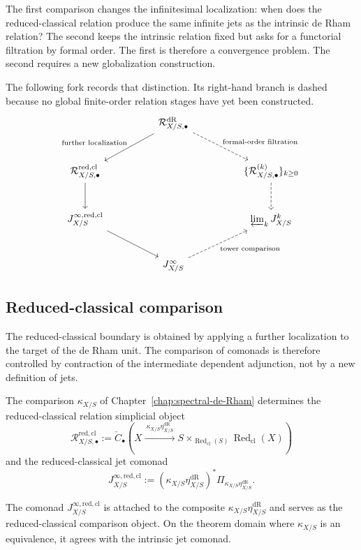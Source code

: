 The first comparison changes the infinitesimal localization: when does the
reduced-classical relation produce the same infinite jets as the intrinsic
de Rham relation? The second keeps the intrinsic relation fixed but asks for a
functorial filtration by formal order. The first is therefore a convergence
problem. The second requires a new globalization construction.

The following fork records that distinction. Its right-hand branch is dashed
because no global finite-order relation stages have yet been constructed.
\[
\begin{tikzcd}[column sep=huge,row sep=large]
&
\mathcal R^{\mathrm{dR}}_{X/S,\bullet}
  \ar[dl,"{\text{further localization}}"']
  \ar[dr,dashed,"{\text{formal-order filtration}}"]
&
\\
\mathcal R^{\mathrm{red,cl}}_{X/S,\bullet}
  \ar[d]
&&
\{\mathcal R^{(k)}_{X/S,\bullet}\}_{k\geq0}
  \ar[d,dashed]
\\
J^{\infty,\mathrm{red,cl}}_{X/S}
  \ar[dr]
&&
\varprojlim_k J^k_{X/S}
\\
&
J^\infty_{X/S}
  \ar[ur,dashed,"{\text{tower comparison}}"']
&
\end{tikzcd}
\]
\subsection{Reduced-classical comparison}
\label{sec:reduced-jet-comparison}

The reduced-classical boundary is obtained by applying a further localization
to the target of the de Rham unit. The comparison of comonads is therefore
controlled by contraction of the intermediate dependent adjunction, not by a
new definition of jets.

The comparison \(\kappa_{X/S}\) of
Chapter~\ref{chap:spectral-de-Rham} determines the reduced-classical relation
simplicial object
\[
  \mathcal R^{\mathrm{red,cl}}_{X/S,\bullet}
  :=
  \check C_\bullet
  \left(
    X
    \xrightarrow{\ \kappa_{X/S}\eta_{X/S}^{\mathrm{dR}}\ }
    S\times_{\operatorname{Red}_{\mathrm{cl}}(S)}
    \operatorname{Red}_{\mathrm{cl}}(X)
  \right)
\]
and the reduced-classical jet comonad
\[
  J^{\infty,\mathrm{red,cl}}_{X/S}
  :=
  (\kappa_{X/S}\eta_{X/S}^{\mathrm{dR}})^*
  \Pi_{\kappa_{X/S}\eta_{X/S}^{\mathrm{dR}}}.
\]

\begin{remark}
The comonad \(J^{\infty,\mathrm{red,cl}}_{X/S}\) is attached to the composite
\(\kappa_{X/S}\eta_{X/S}^{\mathrm{dR}}\) and serves as the reduced-classical
comparison object. On the theorem domain where \(\kappa_{X/S}\) is an
equivalence, it agrees with the intrinsic jet comonad.
\end{remark}

